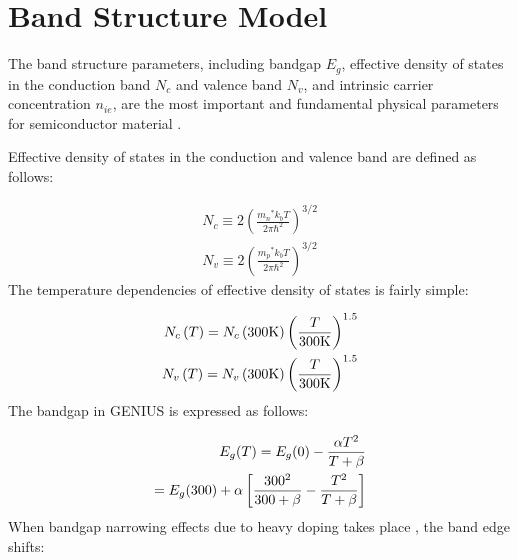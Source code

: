 \documentclass[oneside,12pt]{cgd_book}
\begin{document}
\section{Band Structure Model}
The band structure parameters, including bandgap $E_g$, effective density of
      states in the conduction band $N_c$ and valence band $N_v$, and intrinsic carrier concentration
$n_{ie}$, are the most
      important and fundamental physical parameters for semiconductor material
\cite[Sze1981]{}.
\par
{}Effective density of states
in the conduction and valence band are defined as follows:
\par
\par
\begin{subequations}
\begin{align}
 N_{c}  \equiv 2\left( \frac{{m_{n}}^{*}k_{b}T}{2\pi\hbar^2}\right)^{3/2}\\
 N_{v}  \equiv 2\left( \frac{{m_{p}}^{*}k_{b}T}{2\pi\hbar^2}\right)^{3/2}
\end{align}
\end{subequations}
The temperature dependencies of effective density of states is fairly simple:
\par
\begin{subequations}
\begin{align}
 N_{c}\left(T\right) = N_c \left( 300\text{K} \right)\left( \frac{T}{300\text{K}}\right)^{1.5}\\
 N_{v}\left(T\right)  = N_v \left( 300\text{K} \right)\left( \frac{T}{300\text{K}}\right)^{1.5}
\end{align}
\end{subequations}
The bandgap in GENIUS is expressed as follows:
\par
\par
\begin{subequations}
\begin{align}
 E_g (T) = E_g (0) - \frac{\alpha T^{\rm 2} }{T + \beta} \\
  =E_g (300) + \alpha\left[ \frac{300^{\rm 2} }{300 + \beta} - \frac{T^2}{T + \beta} \right]
\end{align}
\end{subequations}
When bandgap narrowing effects
due to heavy doping takes place \cite[Slotboom1977]{}, the band edge shifts:
\par
\end{document}
